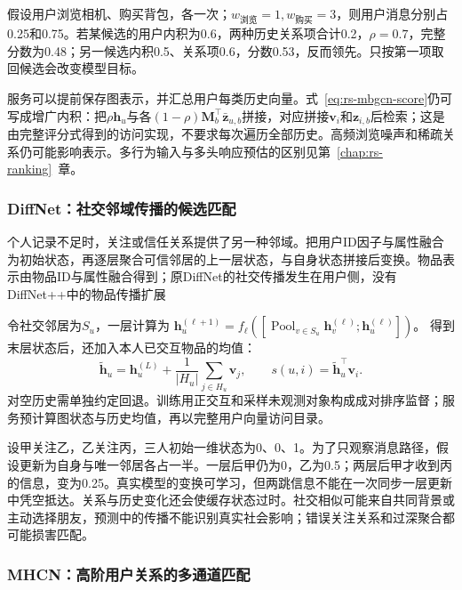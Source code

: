 假设用户浏览相机、购买背包，各一次；$w_{\text{浏览}}=1,w_{\text{购买}}=3$，则用户消息分别占0.25和0.75。若某候选的用户内积为0.6，两种历史关系项合计0.2，$\rho=0.7$，完整分数为0.48；另一候选内积0.5、关系项0.6，分数0.53，反而领先。只按第一项取回候选会改变模型目标。

服务可以提前保存图表示，并汇总用户每类历史向量。式~\eqref{eq:rs-mbgcn-score}仍可写成增广内积：把$\rho\bm h_u$与各$(1-\rho)\bm M_b^\top\bar{\bm z}_{u,b}$拼接，对应拼接$\bm v_i$和$\bm z_{i,b}$后检索；这是由完整评分式得到的访问实现，不要求每次遍历全部历史。高频浏览噪声和稀疏关系仍可能影响表示。多行为输入与多头响应预估的区别见第~\ref{chap:rs-ranking}~章。

\Needspace{90mm}
\subsubsection{DiffNet：社交邻域传播的候选匹配}
\label{sec:rs-diffnet}

个人记录不足时，关注或信任关系提供了另一种邻域。把用户ID因子与属性融合为初始状态，再逐层聚合可信邻居的上一层状态，与自身状态拼接后变换。物品表示由物品ID与属性融合得到；原DiffNet的社交传播发生在用户侧，没有DiffNet++中的物品传播扩展

令社交邻居为$S_u$，一层计算为
$\bm h_u^{(\ell+1)}=f_\ell([\operatorname{Pool}_{v\in S_u}\bm h_v^{(\ell)};\bm h_u^{(\ell)}])$。
得到末层状态后，还加入本人已交互物品的均值：
\begin{equation}
 \widetilde{\bm h}_u=\bm h_u^{(L)}
       +\frac1{|H_u|}\sum_{j\in H_u}\bm v_j,\qquad
 s(u,i)=\widetilde{\bm h}_u^\top\bm v_i.
 \label{eq:rs-diffnet}
\end{equation}
对空历史需单独约定回退。训练用正交互和采样未观测对象构成成对排序监督；服务预计算图状态与历史均值，再以完整用户向量访问目录。

设甲关注乙，乙关注丙，三人初始一维状态为0、0、1。为了只观察消息路径，假设更新为自身与唯一邻居各占一半。一层后甲仍为0，乙为0.5；两层后甲才收到丙的信息，变为0.25。真实模型的变换可学习，但两跳信息不能在一次同步一层更新中凭空抵达。关系与历史变化还会使缓存状态过时。社交相似可能来自共同背景或主动选择朋友，预测中的传播不能识别真实社会影响；错误关注关系和过深聚合都可能损害匹配。

\subsubsection{MHCN：高阶用户关系的多通道匹配}
\label{sec:rs-mhcn}

